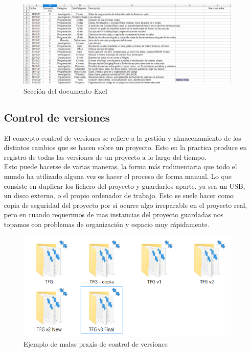 \documentclass[12pt,a4paper]{article}
\begin{document}
\begin{figure}[H]
\centering
  \centering
  \includegraphics[width=1\linewidth]{exel}
\caption{Sección del documento Exel}
\label{fig:subrgrafo}
\end{figure}

	\subsection{Control de versiones}
	El concepto control de versiones se refiere a la gestión y almacenamiento de los distintos cambios que se hacen sobre un proyecto. Esto en la practica produce en registro de todas las versiones de un proyecto a lo largo del tiempo.\\
	Esto puede hacerse de varias maneras, la forma más rudimentaria que todo el mundo ha utilizado alguna vez es hacer el proceso de forma manual. Lo que consiste en duplicar los fichero del proyecto y guardarlos aparte, ya sea un USB, un disco externo, o el propio ordenador de trabajo. Esto se suele hacer como copia de seguridad del proyecto por si ocurre algo irreparable en el proyecto real, pero en cuando requerimos de mas instancias del proyecto guardadas nos topamos con problemas de organización y espacio muy rápidamente.\\
\begin{figure}[H]
\centering
  \centering
  \includegraphics[width=1\linewidth]{control versiones mal}
\caption{Ejemplo de malas praxis de control de versiones}
\label{fig:subrgrafo}
\end{figure}
\end{document}

